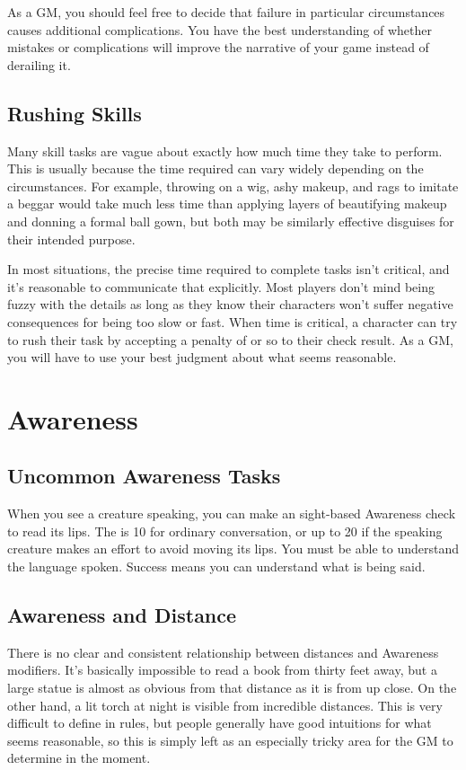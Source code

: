         As a GM, you should feel free to decide that failure in particular circumstances causes additional complications.
        You have the best understanding of whether mistakes or complications will improve the narrative of your game instead of derailing it.

    \subsection{Rushing Skills}
        Many skill tasks are vague about exactly how much time they take to perform.
        This is usually because the time required can vary widely depending on the circumstances.
        For example, throwing on a wig, ashy makeup, and rags to imitate a beggar would take much less time than applying layers of beautifying makeup and donning a formal ball gown, but both may be similarly effective disguises for their intended purpose.

        In most situations, the precise time required to complete tasks isn't critical, and it's reasonable to communicate that explicitly.
        Most players don't mind being fuzzy with the details as long as they know their characters won't suffer negative consequences for being too slow or fast.
        When time is critical, a character can try to rush their task by accepting a penalty of  or so to their check result.
        As a GM, you will have to use your best judgment about what seems reasonable.

\section{Awareness}

    \subsection{Uncommon Awareness Tasks}
         When you see a creature speaking, you can make an sight-based Awareness check to read its lips.
        The  is 10 for ordinary conversation, or up to 20 if the speaking creature makes an effort to avoid moving its lips.
        You must be able to understand the language spoken.
        Success means you can understand what is being said.

    \subsection{Awareness and Distance}
        There is no clear and consistent relationship between distances and Awareness modifiers.
        It's basically impossible to read a book from thirty feet away, but a large statue is almost as obvious from that distance as it is from up close.
        On the other hand, a lit torch at night is visible from incredible distances.
        This is very difficult to define in rules, but people generally have good intuitions for what seems reasonable, so this is simply left as an especially tricky area for the GM to determine in the moment.
        
